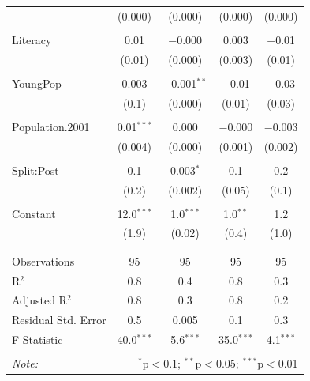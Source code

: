 \documentclass[12pt, a4paper]{article}
\begin{document}
\begin{table}[!htbp]
{\begin{tabular}{@{\extracolsep{5pt}}lcccc}
			& (0.000) & (0.000) & (0.000) & (0.000) \\ 
			& & & & \\ 
			Literacy & 0.01 & $-$0.000 & 0.003 & $-$0.01 \\ 
			& (0.01) & (0.000) & (0.003) & (0.01) \\ 
			& & & & \\ 
			YoungPop & 0.003 & $-$0.001$^{**}$ & $-$0.01 & $-$0.03 \\ 
			& (0.1) & (0.000) & (0.01) & (0.03) \\ 
			& & & & \\ 
			Population.2001 & 0.01$^{***}$ & 0.000 & $-$0.000 & $-$0.003 \\ 
			& (0.004) & (0.000) & (0.001) & (0.002) \\ 
			& & & & \\ 
			Split:Post & 0.1 & 0.003$^{*}$ & 0.1 & 0.2 \\ 
			& (0.2) & (0.002) & (0.05) & (0.1) \\ 
			& & & & \\ 
			Constant & 12.0$^{***}$ & 1.0$^{***}$ & 1.0$^{**}$ & 1.2 \\ 
			& (1.9) & (0.02) & (0.4) & (1.0) \\ 
			& & & & \\ 
			\hline \\[-1.8ex] 
			Observations & 95 & 95 & 95 & 95 \\ 
			R$^{2}$ & 0.8 & 0.4 & 0.8 & 0.3 \\ 
			Adjusted R$^{2}$ & 0.8 & 0.3 & 0.8 & 0.2 \\ 
			Residual Std. Error & 0.5 & 0.005 & 0.1 & 0.3 \\ 
			F Statistic & 40.0$^{***}$ & 5.6$^{***}$ & 35.0$^{***}$ & 4.1$^{***}$ \\ 
			\hline 
			\hline \\[-1.8ex] 
			\textit{Note:}  & \multicolumn{4}{r}{$^{*}$p$<$0.1; $^{**}$p$<$0.05; $^{***}$p$<$0.01} \\ 
		\end{tabular} }
	\end{table} %
\end{document}
